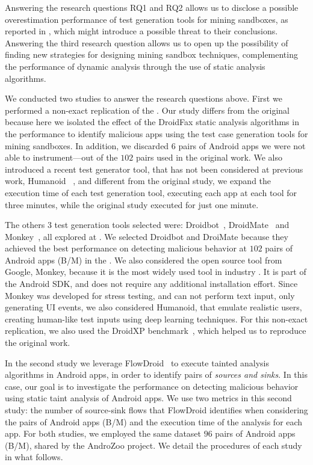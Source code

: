 Answering the research questions RQ1 and RQ2 allows us to disclose a possible overestimation performance of test generation tools for mining sandboxes,
as reported in \blls, which might introduce a possible threat to their conclusions. Answering the third research question
allows us to open up the possibility of finding new strategies for designing mining sandbox techniques, complementing the performance of
dynamic analysis through the use of static analysis algorithms.

We conducted two studies to answer the research questions above. First we performed a non-exact replication of the \blls. Our study differs from the original because here we isolated the effect of the DroidFax static analysis algorithms in the performance to identify malicious apps using the test case generation tools for
mining sandboxes. In addition, we discarded $6$ pairs of
Android apps we were not able to instrument---out of the $102$ pairs used in the original work. We also introduced a recent test generator tool, that has not been considered at previous work, Humanoid ~\cite{DBLP:conf/kbse/LiY0C19}, and different from the original study, we expand the execution time of each test generation tool, executing each app at each tool for three minutes, while the original study executed for just one minute.

The others $3$ test generation tools selected were: Droidbot~\cite{DBLP:conf/icse/LiYGC17},
DroidMate~\cite{DBLP:conf/icse/JamrozikZ16} and Monkey~\cite{Monkey}, all explored at \blls. We selected Droidbot and DroiMate because they achieved
the best performance on detecting malicious behavior at $102$ pairs of Android apps (B/M) in the \blls. We also considered the open source tool from Google, Monkey, because it is the most widely used tool in industry \cite{DBLP:conf/sigsoft/ZengLZXDLYX16}. It is part of the Android SDK, and does not require any additional installation effort. Since Monkey was developed for stress testing, and can not perform text input, only generating
UI events, we also considered Humanoid, that emulate realistic users, creating human-like test inputs using deep learning techniques.
For this non-exact replication, we also used the DroidXP benchmark~\cite{DBLP:conf/scam/CostaMCMVBC20},
which helped us to reproduce the original work.

In the second study we leverage FlowDroid~\cite{DBLP:conf/pldi/ArztRFBBKTOM14} to execute
tainted analysis algorithms in Android apps, in order to identify pairs of \emph{sources and sinks}. In this case,
our goal is to investigate the performance on detecting malicious
behavior using static taint analysis of Android apps. We use two metrics in this second study: the number
of source-sink flows that FlowDroid identifies when considering the pairs of Android apps (B/M) and the
execution time of the analysis for each app.
For both studies, we employed the same dataset $96$ pairs of Android apps (B/M),
shared by the AndroZoo \cite{DBLP:conf/msr/AllixBKT16} project. We detail the procedures of each study in what follows.

